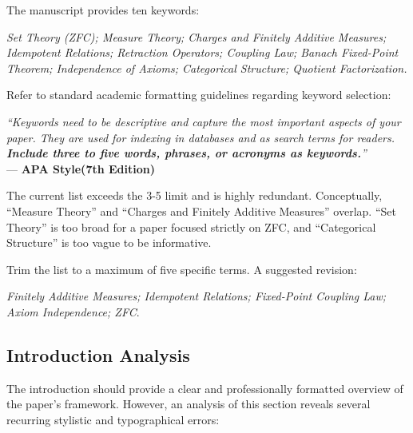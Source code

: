 \documentclass[11pt, a4paper]{article}
\begin{document}
The manuscript provides ten keywords:

\begin{center}
    \textit{Set Theory (ZFC); Measure Theory; Charges and Finitely Additive Measures; Idempotent Relations; Retraction Operators; Coupling Law; Banach Fixed-Point Theorem; Independence of Axioms; Categorical Structure; Quotient Factorization.} 
\end{center}



Refer to standard academic formatting guidelines regarding keyword selection:

\begin{center}
    \small \textit{``Keywords need to be descriptive and capture the most important aspects of your paper. They are used for indexing in databases and as search terms for readers. \textbf{Include three to five words, phrases, or acronyms as keywords.}''} \\
    --- \textbf{APA Style(7th Edition)}
\end{center}

The current list exceeds the 3-5 limit and is highly redundant. Conceptually, ``Measure Theory'' and ``Charges and Finitely Additive Measures'' overlap. ``Set Theory'' is too broad for a paper focused strictly on ZFC, and ``Categorical Structure'' is too vague to be informative.

Trim the list to a maximum of five specific terms. A suggested revision: 
\begin{center}
\textit{Finitely Additive Measures; Idempotent Relations; Fixed-Point Coupling Law; Axiom Independence; ZFC}.
\end{center}

\subsection{Introduction Analysis}
The introduction should provide a clear and professionally formatted overview of the paper's framework. However, an analysis of this section reveals several recurring stylistic and typographical errors:
\end{document}
